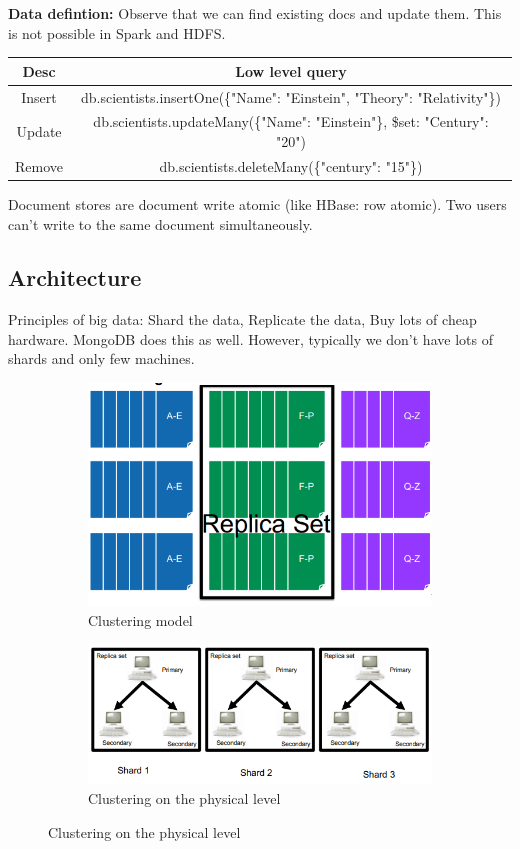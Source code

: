 \documentclass[11pt,oneside,a4paper]{article}
\begin{document}
\textbf{Data defintion:} Observe that we can find existing docs and update them. This is not possible in Spark and HDFS.

\begin{table}
\centering
\begin{tabular}{|c|c|}
	\hline 
	\textbf{Desc} & \textbf{Low level query} \\ 
	\hline 
	Insert & db.scientists.insertOne(\{"Name": "Einstein", "Theory": "Relativity"\}) \\ 
	\hline 
	Update & db.scientists.updateMany(\{"Name": "Einstein"\},
	{ \$set: {"Century": "20"}}) \\ 
	\hline 
	Remove & db.scientists.deleteMany(\{"century": "15"\}) \\ 
	\hline 
\end{tabular} 
\end{table}


Document stores are document write atomic (like HBase: row atomic). Two users can't write to the same document simultaneously.

\subsection{Architecture}

Principles of big data:  Shard the data, Replicate the data,  Buy lots of cheap hardware. MongoDB does this as well. However, typically we don't have lots of shards and only few machines.

\begin{figure}[hb!]
	\centering
	\begin{subfigure}[t]{.5\textwidth}
		\centering
		\includegraphics[width=0.6\linewidth]{figures/docstores_clustering}
		\caption{Clustering model}
	\end{subfigure}%
	\begin{subfigure}[t]{.5\textwidth}
		\centering
		\includegraphics[width=0.8\linewidth]{figures/docstores_clustering_phys}
		\caption{Clustering on the physical level}
	\end{subfigure}
\end{figure}
\end{document}
